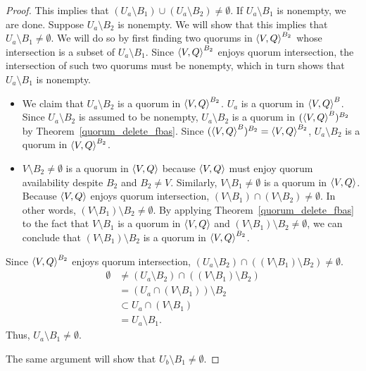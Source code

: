 \documentclass[12pt, psamsfonts]{amsart}
\theoremstyle{definition}
\theoremstyle{remark}
\numberwithin{equation}{subsection}
\begin{document}
\begin{proof}
	This implies that $(U_a \setminus B_1) \cup (U_a \setminus B_2) \ne \emptyset$.
    If $U_a \setminus B_1$ is nonempty, we are done.
    Suppose $U_a \setminus B_2$ is nonempty.
    We will show that this implies that $U_a \setminus B_1 \ne \emptyset$.
    We will do so by first finding two quorums in $\ev{V, Q}^{B_2}$ whose intersection is a subset of $U_a \setminus B_1$.
	Since $\ev{V, Q}^{B_2}$ enjoys quorum intersection, the intersection of such two quorums must be nonempty, which in turn shows that $U_a \setminus B_1$ is nonempty.

	\begin{itemize}
		\item
            We claim that $U_a \setminus B_2$ is a quorum in $\ev{V, Q}^{B_2}$.
            $U_a$ is a quorum in $\ev{V, Q}^B$.
            Since $U_a \setminus B_2$ is assumed to be nonempty, $U_a \setminus B_2$ is a quorum in $(\ev{V, Q}^B)^{B_2}$ by Theorem~\ref{quorum_delete_fbas}.
            Since $(\ev{V, Q}^B)^{B_2} = \ev{V, Q}^{B_2}$, $U_a \setminus B_2$ is a quorum in $\ev{V, Q}^{B_2}$.
		\item
            $V \setminus B_2 \ne \emptyset$ is a quorum in $\ev{V, Q}$ because $\ev{V, Q}$ must enjoy quorum availability despite $B_2$ and $B_2 \ne V$.
			Similarly, $V \setminus B_1 \ne \emptyset$ is a quorum in $\ev{V, Q}$.
			Because $\ev{V, Q}$ enjoys quorum intersection, $(V \setminus B_1) \cap (V \setminus B_2) \ne \emptyset$.
			In other words, $(V \setminus B_1) \setminus B_2 \ne \emptyset$.
            By applying Theorem~\ref{quorum_delete_fbas} to the fact that $V \setminus B_1$ is a quorum in $\ev{V, Q}$ and $(V \setminus B_1) \setminus B_2 \ne \emptyset$, we can conclude that $(V \setminus B_1) \setminus B_2$ is a quorum in $\ev{V, Q}^{B_2}$.
	\end{itemize}
	Since $\ev{V, Q}^{B_2}$ enjoys quorum intersection, $(U_a \setminus B_2) \cap ((V \setminus B_1) \setminus B_2) \ne \emptyset$.
	\begin{align*}
        \emptyset
            &\ne (U_a \setminus B_2) \cap ((V \setminus B_1) \setminus B_2) \\
            &= (U_a \cap (V \setminus B_1)) \setminus B_2 \\
            &\subset U_a \cap (V \setminus B_1) \\
            &= U_a \setminus B_1.
	\end{align*}
	Thus, $U_a \setminus B_1 \ne \emptyset$.

	The same argument will show that $U_b \setminus B_1 \ne \emptyset$.
\end{proof}
\end{document}
